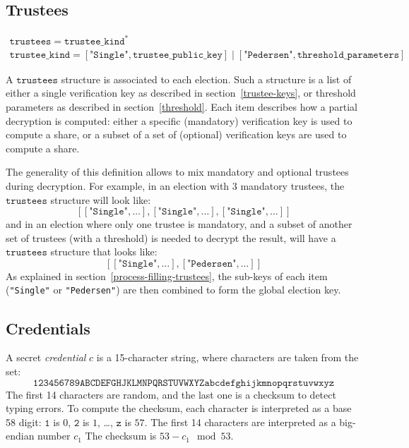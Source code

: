 \documentclass[a4paper]{article}
\begin{document}
\subsection{Trustees}
\label{trustees}

\begin{gather*}
  \texttt{trustees}=\texttt{trustee\_kind}^\ast\\
  \texttt{trustee\_kind}=
  [\texttt{"Single"},\texttt{trustee\_public\_key}]\mid
  [\texttt{"Pedersen"},\texttt{threshold\_parameters}]
\end{gather*}

A $\texttt{trustees}$ structure is associated to each election. Such a
structure is a list of either a single verification key as described in
section~\ref{trustee-keys}, or threshold parameters as described in
section~\ref{threshold}.  Each item describes how a partial decryption
is computed: either a specific (mandatory) verification key is used to
compute a share, or a subset of a set of (optional) verification keys
are used to compute a share.

The generality of this definition allows to mix mandatory and optional
trustees during decryption. For example, in an election with 3
mandatory trustees, the $\texttt{trustees}$ structure will look like:
\[
  [[\texttt{"Single"},\dotsc],[\texttt{"Single"},\dotsc],[\texttt{"Single"},\dotsc]]
\]
and in an election where only one trustee is mandatory, and a subset
of another set of trustees (with a threshold) is needed to decrypt the
result, will have a $\texttt{trustees}$ structure that looks like:
\[
  [[\texttt{"Single"},\dotsc],[\texttt{"Pedersen"},\dotsc]]
\]
As explained in section~\ref{process-filling-trustees}, the sub-keys
of each item (\texttt{"Single"} or \texttt{"Pedersen"}) are then
combined to form the global election key.

\subsection{Credentials}
\label{credentials}

\newcommand{\secret}{\texttt{secret}}

A secret \emph{credential} $c$ is a 15-character string, where characters are
taken from the set:
\[\texttt{123456789ABCDEFGHJKLMNPQRSTUVWXYZabcdefghijkmnopqrstuvwxyz}\]
The first 14 characters are random, and the last one is a checksum to
detect typing errors. To compute the checksum, each character is
interpreted as a base 58 digit: $\texttt{1}$ is $0$, $\texttt{2}$ is
$1$, \dots, $\texttt{z}$ is $57$. The first 14 characters are
interpreted as a big-endian number $c_1$ The checksum is $53-c_1\mod
53$.
\end{document}
